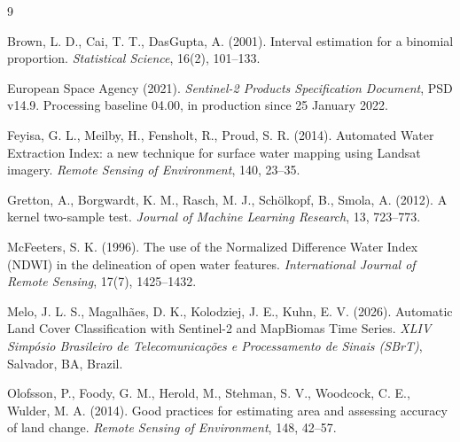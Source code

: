 \documentclass[11pt,a4paper,oneside]{book}
\begin{document}
%
%
\clearpage
{}
{}
\begin{thebibliography}{9}

Brown, L. D., Cai, T. T., DasGupta, A. (2001). Interval estimation for a
binomial proportion. \emph{Statistical Science}, 16(2), 101--133.

European Space Agency (2021). \emph{Sentinel-2 Products Specification
Document}, PSD v14.9. Processing baseline 04.00, in production since 25 January
2022.

Feyisa, G. L., Meilby, H., Fensholt, R., Proud, S. R. (2014). Automated Water
Extraction Index: a new technique for surface water mapping using Landsat
imagery. \emph{Remote Sensing of Environment}, 140, 23--35.

Gretton, A., Borgwardt, K. M., Rasch, M. J., Schölkopf, B., Smola, A. (2012).
A kernel two-sample test. \emph{Journal of Machine Learning Research}, 13,
723--773.

McFeeters, S. K. (1996). The use of the Normalized Difference Water Index
(NDWI) in the delineation of open water features. \emph{International Journal of
Remote Sensing}, 17(7), 1425--1432.

Melo, J. L. S., Magalhães, D. K., Kolodziej, J. E., Kuhn, E. V. (2026).
Automatic Land Cover Classification with Sentinel-2 and MapBiomas Time Series.
\emph{XLIV Simpósio Brasileiro de Telecomunicações e Processamento de Sinais
(SBrT)}, Salvador, BA, Brazil.

Olofsson, P., Foody, G. M., Herold, M., Stehman, S. V., Woodcock, C. E.,
Wulder, M. A. (2014). Good practices for estimating area and assessing accuracy
of land change. \emph{Remote Sensing of Environment}, 148, 42--57.


\end{thebibliography}
\end{document}
